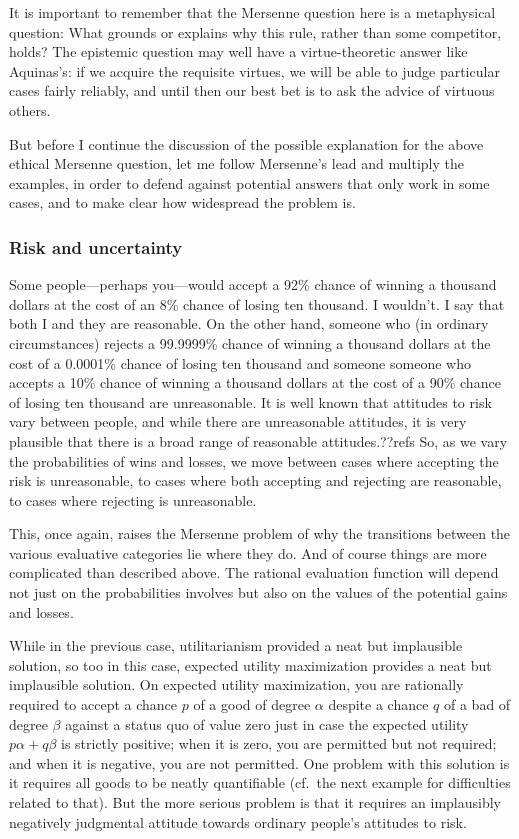It is important to remember that the Mersenne question here is a metaphysical question: What grounds or explains why this
rule, rather than some competitor, holds? The epistemic question may well have a virtue-theoretic answer like Aquinas's: if
we acquire the requisite virtues, we will be able to judge particular cases fairly reliably, and until then our best bet is
to ask the advice of virtuous others.

But before I continue the discussion of the possible explanation for the above ethical Mersenne question, let me follow
Mersenne's lead and multiply the examples, in order to defend against potential answers that only work in some cases, and
to make clear how widespread the problem is.

\subsubsection{Risk and uncertainty}
Some people---perhaps you---would accept a 92\% chance of winning a thousand dollars at the cost of an 8\% chance
of losing ten thousand. I wouldn't. I say that both I and they are reasonable. On the other hand, someone who 
(in ordinary circumstances) rejects a 99.9999\% chance of winning a thousand dollars at the cost of a 0.0001\% chance
of losing ten thousand and someone someone who accepts a 10\% chance of winning a thousand dollars at the cost of a 90\% chance
of losing ten thousand are unreasonable. 
It is well known that attitudes to risk vary between people, and while there are unreasonable attitudes, it is very plausible
that there is a broad range of reasonable attitudes.??refs
So, as we vary the probabilities of wins and losses, we move between cases
where accepting the risk is unreasonable, to cases where both accepting and rejecting are reasonable, to cases where
rejecting is unreasonable.

This, once again, raises the Mersenne problem of why the transitions between the various evaluative categories lie where they
do.  And of course things are more complicated than described above. The rational evaluation function will depend not just
on the probabilities involves but also on the values of the potential gains and losses. 

While in the previous case, utilitarianism provided a neat but implausible solution, so too in this case, expected utility
maximization provides a neat but implausible solution. On expected utility maximization, you are rationally required to
accept a chance $p$ of a good of degree $\alpha$ despite a chance $q$ of a bad of degree $\beta$ against a status quo of
value zero just in case the
expected utility $p\alpha + q\beta$ is strictly positive; when it is zero, you are permitted but not required; 
and when it is negative, you are not permitted. One problem with this solution is it requires all goods to be neatly
quantifiable (cf.\ the next example for difficulties related to that). But the more serious problem is that it requires an
implausibly negatively judgmental attitude towards ordinary people's attitudes to risk.

